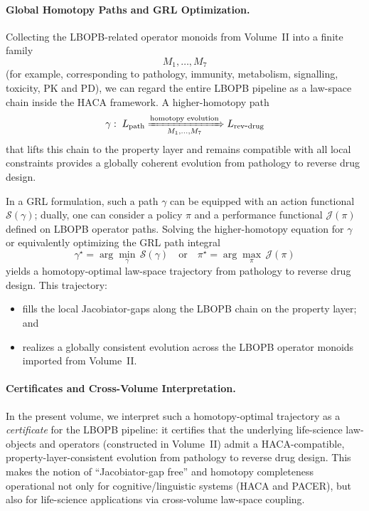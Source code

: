 \documentclass[11pt]{book}
\theoremstyle{plain}
\theoremstyle{definition}
\theoremstyle{remark}
\begin{document}
\paragraph{Global Homotopy Paths and GRL Optimization.}
Collecting the LBOPB-related operator monoids from Volume~II into a finite
family
\[
  M_1,\dots,M_7
\]
(for example, corresponding to pathology, immunity, metabolism, signalling,
toxicity, PK and PD), we can regard the entire LBOPB pipeline as a
law-space chain inside the HACA framework. A higher-homotopy path
\[
  \gamma:\;
  L_{\mathrm{path}}
  \xRightarrow[\;M_1,\dots,M_7\;]{\text{homotopy evolution}}
  L_{\mathrm{rev\mbox{-}drug}}
\]
that lifts this chain to the property layer and remains compatible with all
local constraints provides a globally coherent evolution from pathology to
reverse drug design.

In a GRL formulation, such a path $\gamma$ can be equipped with an action
functional $\mathcal{S}(\gamma)$; dually, one can consider a policy
$\pi$ and a performance functional $\mathcal{J}(\pi)$ defined on LBOPB
operator paths. Solving the higher-homotopy equation for $\gamma$ or
equivalently optimizing the GRL path integral
\[
  \gamma^\star = \arg\min_{\gamma}\, \mathcal{S}(\gamma)
  \quad\text{or}\quad
  \pi^\star = \arg\max_{\pi}\, \mathcal{J}(\pi)
\]
yields a homotopy-optimal law-space trajectory from pathology to reverse
drug design. This trajectory:
\begin{itemize}
  \item fills the local Jacobiator-gaps along the LBOPB chain on the
        property layer; and
  \item realizes a globally consistent evolution across the LBOPB operator
        monoids imported from Volume~II.
\end{itemize}

\paragraph{Certificates and Cross-Volume Interpretation.}
In the present volume, we interpret such a homotopy-optimal trajectory as a
\emph{certificate} for the LBOPB pipeline: it certifies that the underlying
life-science law-objects and operators (constructed in Volume~II) admit a
HACA-compatible, property-layer-consistent evolution from pathology to
reverse drug design. This makes the notion of ``Jacobiator-gap free'' and
homotopy completeness operational not only for cognitive/linguistic
systems (HACA and PACER), but also for life-science applications via
cross-volume law-space coupling.
\end{document}
